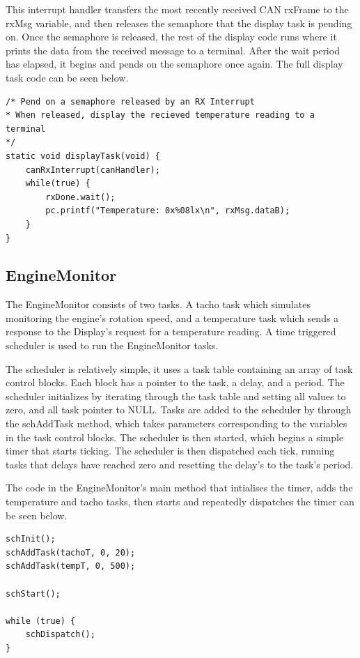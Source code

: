 \documentclass[]{report}
\begin{document}
			This interrupt handler transfers the most recently received CAN rxFrame to the rxMsg variable, and then releases the semaphore that the display task is pending on. Once the semaphore is released, the rest of the display code runs where it prints the data from the received message to a terminal. After the wait period has elapsed, it begins and pends on the semaphore once again. The full display task code can be seen below.
			
\begin{lstlisting}
/* Pend on a semaphore released by an RX Interrupt
* When released, display the recieved temperature reading to a terminal
*/
static void displayTask(void) {
	canRxInterrupt(canHandler);
	while(true) {
		rxDone.wait();
		pc.printf("Temperature: 0x%08lx\n", rxMsg.dataB);
	}
}
\end{lstlisting}

			\subsection{EngineMonitor}
			The EngineMonitor consists of two tasks. A tacho task which simulates monitoring the engine's rotation speed, and a temperature task which sends a response to the Display's request for a temperature reading. A time triggered scheduler is used to run the EngineMonitor tasks. 
			
			The scheduler is relatively simple, it uses a task table containing an array of task control blocks. Each block has a pointer to the task, a delay, and a period. The scheduler initializes by iterating through the task table and setting all values to zero, and all task pointer to NULL. Tasks are added to the scheduler by through the schAddTask method, which takes parameters corresponding to the variables in the task control blocks. The scheduler is then started, which begins a simple timer that starts ticking. The scheduler is then dispatched each tick, running tasks that delays have reached zero and resetting the delay's to the task's period. 
			
			The code in the EngineMonitor's main method that intialises the timer, adds the temperature and tacho tasks, then starts and repeatedly dispatches the timer can be seen below.
			
\begin{lstlisting}
schInit();
schAddTask(tachoT, 0, 20);
schAddTask(tempT, 0, 500);
			
schStart();

while (true) {
	schDispatch();
}
\end{lstlisting}
\end{document}

